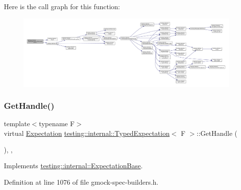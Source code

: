 Here is the call graph for this function\+:
\nopagebreak
\begin{figure}[H]
\begin{center}
\leavevmode
\includegraphics[width=350pt]{classtesting_1_1internal_1_1TypedExpectation_a5053b8335ca295b34cd6a68f8d462602_cgraph}
\end{center}
\end{figure}
\mbox{\label{classtesting_1_1internal_1_1TypedExpectation_adc2859080623243a3886a80ab62911da}} 
\subsubsection{\texorpdfstring{Get\+Handle()}{GetHandle()}}
{\footnotesize\ttfamily template$<$typename F$>$ \\
virtual \hyperlink{classtesting_1_1Expectation}{Expectation} \hyperlink{classtesting_1_1internal_1_1TypedExpectation}{testing\+::internal\+::\+Typed\+Expectation}$<$ F $>$\+::Get\+Handle (\begin{DoxyParamCaption}{ }\end{DoxyParamCaption})\hspace{0.3cm}{\ttfamily [inline]}, {\ttfamily [private]}, {\ttfamily [virtual]}}



Implements \hyperlink{classtesting_1_1internal_1_1ExpectationBase_a678f6fc24742ab0236ebc9a8128e7bfe}{testing\+::internal\+::\+Expectation\+Base}.



Definition at line 1076 of file gmock-\/spec-\/builders.\+h.


